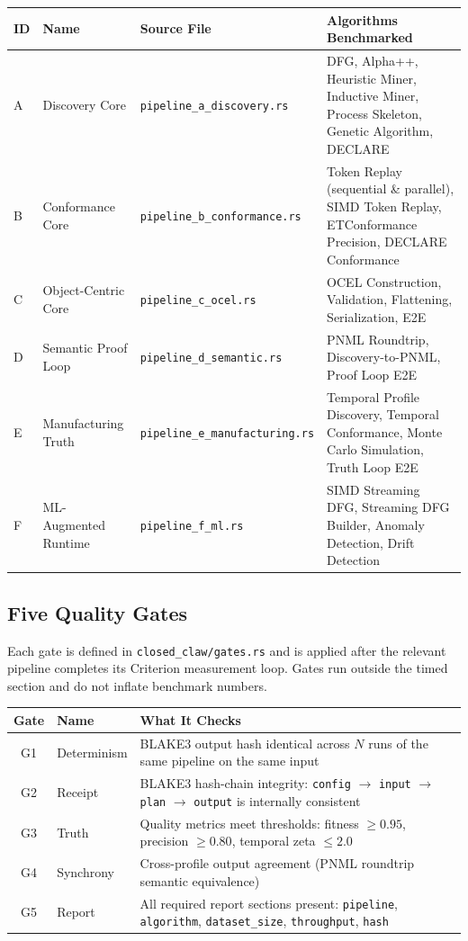 \documentclass[11pt,a4paper]{article}
\begin{document}
\begin{longtable}{@{}lll>{\raggedright\arraybackslash}p{7cm}@{}}
\toprule
\textbf{ID} & \textbf{Name} & \textbf{Source File} & \textbf{Algorithms Benchmarked} \\
\midrule
\endhead
A & Discovery Core & \texttt{pipeline\_a\_discovery.rs} &
    DFG, Alpha++, Heuristic Miner, Inductive Miner, Process Skeleton,
    Genetic Algorithm, DECLARE \\[4pt]
B & Conformance Core & \texttt{pipeline\_b\_conformance.rs} &
    Token Replay (sequential \& parallel), SIMD Token Replay,
    ETConformance Precision, DECLARE Conformance \\[4pt]
C & Object-Centric Core & \texttt{pipeline\_c\_ocel.rs} &
    OCEL Construction, Validation, Flattening, Serialization, E2E \\[4pt]
D & Semantic Proof Loop & \texttt{pipeline\_d\_semantic.rs} &
    PNML Roundtrip, Discovery-to-PNML, Proof Loop E2E \\[4pt]
E & Manufacturing Truth & \texttt{pipeline\_e\_manufacturing.rs} &
    Temporal Profile Discovery, Temporal Conformance,
    Monte Carlo Simulation, Truth Loop E2E \\[4pt]
F & ML-Augmented Runtime & \texttt{pipeline\_f\_ml.rs} &
    SIMD Streaming DFG, Streaming DFG Builder,
    Anomaly Detection, Drift Detection \\
\bottomrule
\end{longtable}

\subsection{Five Quality Gates}

Each gate is defined in \texttt{closed\_claw/gates.rs} and is applied
after the relevant pipeline completes its Criterion measurement loop.
Gates run outside the timed section and do not inflate benchmark numbers.

\begin{center}
\begin{tabular}{@{}clp{9cm}@{}}
\toprule
\textbf{Gate} & \textbf{Name} & \textbf{What It Checks} \\
\midrule
G1 & Determinism & BLAKE3 output hash identical across $N$ runs of the same
                   pipeline on the same input \\[4pt]
G2 & Receipt & BLAKE3 hash-chain integrity:
               \texttt{config} $\to$ \texttt{input} $\to$ \texttt{plan} $\to$
               \texttt{output} is internally consistent \\[4pt]
G3 & Truth & Quality metrics meet thresholds: fitness $\geq 0.95$,
             precision $\geq 0.80$, temporal zeta $\leq 2.0$ \\[4pt]
G4 & Synchrony & Cross-profile output agreement (PNML roundtrip
                 semantic equivalence) \\[4pt]
G5 & Report & All required report sections present:
              \texttt{pipeline}, \texttt{algorithm}, \texttt{dataset\_size},
              \texttt{throughput}, \texttt{hash} \\
\bottomrule
\end{tabular}
\end{center}
\end{document}

